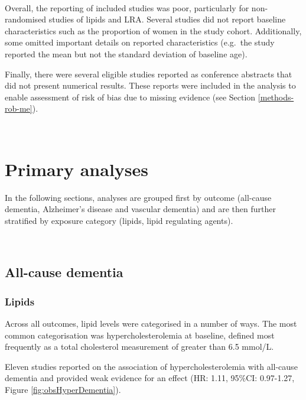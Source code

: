 \documentclass[a4paper, twoside]{templates/ociamthesis}
\begin{document}
~

Overall, the reporting of included studies was poor, particularly for non-randomised studies of lipids and LRA. Several studies did not report baseline characteristics such as the proportion of women in the study cohort. Additionally, some omitted important details on reported characteristics (e.g.~the study reported the mean but not the standard deviation of baseline age).

Finally, there were several eligible studies reported as conference abstracts that did not present numerical results. These reports were included in the analysis to enable assessment of risk of bias due to missing evidence (see Section \ref{methods-rob-me}).

~

\hypertarget{primary-analyses}{%
\section{Primary analyses}\label{primary-analyses}}

In the following sections, analyses are grouped first by outcome (all-cause dementia, Alzheimer's disease and vascular dementia) and are then further stratified by exposure category (lipids, lipid regulating agents).

~

\hypertarget{sys-rev-res-Dementia}{%
\subsection{All-cause dementia}\label{sys-rev-res-Dementia}}

\hypertarget{lipids}{%
\subsubsection{Lipids}\label{lipids}}

Across all outcomes, lipid levels were categorised in a number of ways. The most common categorisation was hypercholesterolemia at baseline, defined most frequently as a total cholesterol measurement of greater than 6.5 mmol/L.

Eleven studies reported on the association of hypercholesterolemia with all-cause dementia and provided weak evidence for an effect (HR: 1.11, 95\%CI: 0.97-1.27, Figure \ref{fig:obsHyperDementia}).
\end{document}
